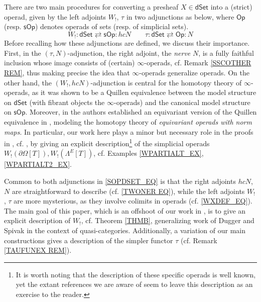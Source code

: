 \documentclass{hha}
\theoremstyle{definition} %
\newcommand{\Op}{\mathsf{Op}}
\newcommand{\sOp}{\mathsf{sOp}}
\newcommand{\dSet}{\mathsf{dSet}}
\begin{document}
There are two main procedures for converting a presheaf
$X \in \mathsf{dSet}$
into a (strict) operad,
given by the left adjoints
$W_!$, $\tau$
in two adjunctions as below,
where $\Op$ (resp. $\sOp$) 
denotes operads of sets (resp. of simplicial sets).
\begin{equation}\label{SOPDSET_EQ}
	W_! \colon \dSet \rightleftarrows \sOp \colon h c N
	\qquad
	\tau \colon \dSet \rightleftarrows \Op \colon N
\end{equation}
Before recalling how these adjunctions are defined,
we discuss their importance. 
First, in the $(\tau,N)$-adjunction,
the right adjoint, the \emph{nerve} $N$,
is a fully faithful inclusion whose image consists of 
(certain) $\infty$-operads, 
cf. Remark \ref{SSCOTHER REM},
thus making precise the idea that 
$\infty$-operads generalize operads.
On the other hand, the $(W_!,hcN)$-adjunction
is central for the homotopy theory of $\infty$-operads,
as it was shown to be a Quillen equivalence \cite{CM13b}
between the model structure on $\dSet$ 
(with fibrant objects the $\infty$-operads)
and the canonical model structure on $\sOp$.
Moreover, in \cite{BP_TAS} the authors established an equivariant
version of the Quillen equivalence in \cite{CM13b},
modeling the homotopy theory of 
\emph{equivariant operads with norm maps}.
In particular, 
our work here plays a minor but necessary role in the proofs
in \cite{BP_TAS},
cf. \cite[Lemma 4.52]{BP_TAS},
by giving an explicit description\footnote{It is worth noting that the description of these specific operads is well known,
yet the extant references we are aware of seem to leave
this description as an exercise to the reader.}
of the simplicial operads
$W_!(\partial \Omega[T]),W_!(\Lambda^E[T])$,
cf. Examples \ref{WPARTIALT_EX},\ref{WPARTIALT2_EX}.


Common to both adjunctions in \eqref{SOPDSET_EQ}
is that the right adjoints
$hcN$, $N$ are straightforward to describe
(cf. \eqref{TWONER EQ}), 
while the left adjoints $W_!$, $\tau$ are more mysterious,
as they involve colimits in operads (cf. \eqref{WXDEF_EQ}).
The main goal of this paper, 
which is an offshoot of our work in \cite{BP_TAS},
is to give an explicit description of $W_!$,
cf. Theorem \ref{THMB},
generalizing work of Dugger and Spivak \cite{DS11}
in the context of quasi-categories.
Additionally, a variation of our main constructions
gives a description of the simpler functor $\tau$
(cf. Remark \ref{TAUFUNEX REM}).
\end{document}
